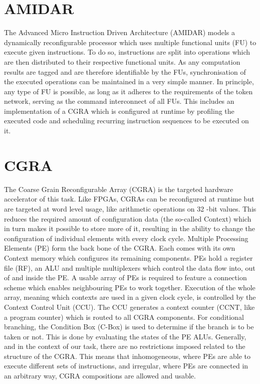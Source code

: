 	\section{AMIDAR} %
	\label{sec:intro_amidar}
		The Advanced Micro Instruction Driven Architecture (AMIDAR) models a dynamically reconfigurable processor which uses multiple functional units (FU) to execute given instructions. 
		To do so, instructions are split into operations which are then distributed to their respective functional units. As any computation results are tagged and are therefore identifiable by the FUs, synchronisation of the executed operations can be maintained in a very simple manner. 
		In principle, any type of FU is possible, as long as it adheres to the requirements of the token network, serving as the command interconnect of all FUs. This includes an implementation of a CGRA which is configured at runtime by profiling the executed code and scheduling recurring instruction sequences to be executed on it.

	\section{CGRA} %
	\label{sec:intro_cgra}
		The Coarse Grain Reconfigurable Array (CGRA) is the targeted hardware accelerator of this task. Like FPGAs, CGRAs can be reconfigured at runtime but are targeted at word level usage, like arithmetic operations on \num{32} -bit values. This reduces the required amount of configuration data (the so-called Context) which in turn makes it possible to store more of it, resulting in the ability to change the configuration of individual elements with every clock cycle.
		Multiple Processing Elements (PE) form the back bone of the CGRA. Each comes with its own Context memory which configures its remaining components. PEs hold a register file (RF), an ALU and multiple multiplexers which control the data flow into, out of and inside the PE. A usable array of PEs is required to feature a connection scheme which enables neighbouring PEs to work together.
		Execution of the whole array, meaning which contexts are used in a given clock cycle, is controlled by the Context Control Unit (CCU). The CCU generates a context counter (CCNT, like a program counter) which is routed to all CGRA components. For conditional branching, the Condition Box (C-Box) is used to determine if the branch is to be taken or not. This is done by evaluating the states of the PE ALUs.
		Generally, and in the context of our task, there are no restrictions imposed related to the structure of the CGRA. This means that inhomogeneous, where PEs are able to execute different sets of instructions, and irregular, where PEs are connected in an arbitrary way, CGRA compositions are allowed and usable.


